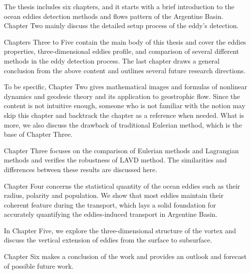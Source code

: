 The thesis includes six chapters, and it starts with a brief introduction to the ocean eddies detection methods and flows pattern of the Argentine Basin. Chapter Two mainly discuss the detailed setup process of the eddy’s detection.

Chapters Three to Five contain the main body of this thesis and cover the eddies properties, three-dimensional eddies profile, and comparison of several different methods in the eddy detection process. The last chapter draws a general conclusion from the above content and outlines several future research directions.

To be specific, Chapter Two gives mathematical images and formulas of nonlinear dynamics and geodesic theory and its application to geostrophic flow. Since the content is not intuitive enough, someone who is not familiar with the notion may skip this chapter and backtrack the chapter as a reference when needed. What is more, we also discuss the drawback of traditional Eulerian method, which is the base of Chapter Three.

Chapter Three focuses on the comparison of Eulerian methods and Lagrangian methods and verifies the robustness of LAVD method. The similarities and differences between these results are discussed here.

Chapter Four concerns the statistical quantity of the ocean eddies such as their radius, polarity and population. We show that most eddies maintain their coherent feature during the transport, which lays a solid foundation for accurately quantifying the eddies-induced transport in Argentine Basin.

In Chapter Five, we explore the three-dimensional structure of the vortex and discuss the vertical extension of eddies from the surface to subsurface. 

Chapter Six makes a conclusion of the work and provides an outlook and forecast of possible future work.

\newpage

